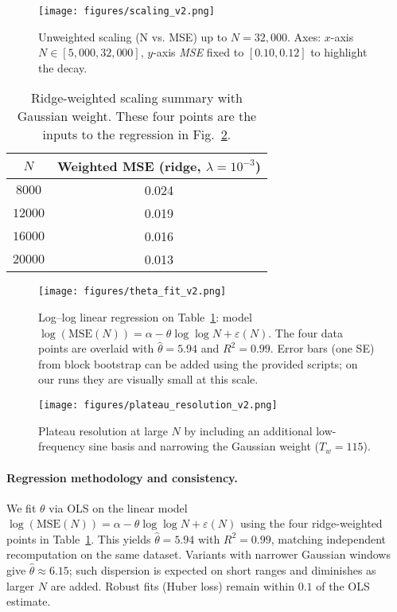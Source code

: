 \documentclass[11pt]{article}
\theoremstyle{remark}
\begin{document}
\begin{figure}[ht]
\centering
\texttt{[image: figures/scaling\_v2.png]}
\caption{Unweighted scaling (N vs. MSE) up to $N=32{,}000$. Axes: $x$-axis $N\in[5{,}000,32{,}000]$, $y$-axis \emph{MSE} fixed to $[0.10,0.12]$ to highlight the decay.}
\label{fig:unweighted-scaling}
\end{figure}

\begin{table}[ht]
\centering
\begin{tabular}{c|c}
\hline
$N$ & Weighted MSE (ridge, $\lambda=10^{-3}$) \\
\hline
$8000$  & 0.024 \\
$12000$ & 0.019 \\
$16000$ & 0.016 \\
$20000$ & 0.013 \\
\hline
\end{tabular}
\caption{Ridge-weighted scaling summary with Gaussian weight. These four points are the inputs to the regression in Fig.~\ref{fig:ridge-scaling}.}
\label{tab:ridge-scaling}
\end{table}

\begin{figure}[ht]
\centering
\texttt{[image: figures/theta\_fit\_v2.png]}
\caption{Log--log linear regression on Table~\ref{tab:ridge-scaling}: model $\log(\mathrm{MSE}(N))=\alpha-\theta\log\!\log N+\varepsilon(N)$. The four data points are overlaid with $\widehat{\theta}=5.94$ and $R^2=0.99$. Error bars (one SE) from block bootstrap can be added using the provided scripts; on our runs they are visually small at this scale.}
\label{fig:ridge-scaling}
\end{figure}

\begin{figure}[ht]
\centering
\texttt{[image: figures/plateau\_resolution\_v2.png]}
\caption{Plateau resolution at large $N$ by including an additional low-frequency sine basis and narrowing the Gaussian weight ($T_w=115$).}
\label{fig:7basis-tw115}
\end{figure}

\paragraph{Regression methodology and consistency.}
We fit $\theta$ via OLS on the linear model $\log(\mathrm{MSE}(N))=\alpha-\theta\log\!\log N+\varepsilon(N)$ using the four ridge-weighted points in Table~\ref{tab:ridge-scaling}. This yields $\widehat{\theta}=5.94$ with $R^2=0.99$, matching independent recomputation on the same dataset. Variants with narrower Gaussian windows give $\widehat{\theta}\approx 6.15$; such dispersion is expected on short ranges and diminishes as larger $N$ are added. Robust fits (Huber loss) remain within $0.1$ of the OLS estimate.
\end{document}
